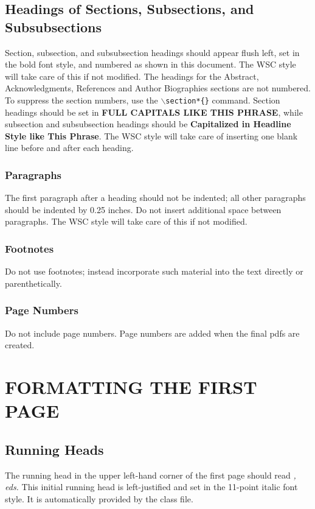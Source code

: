 \documentclass{wscpaperproc}
\theoremstyle{wsc}
\begin{document}
\subsection{Headings of Sections, Subsections, and Subsubsections}
Section, subsection, and subsubsection headings should appear flush left, set in the bold font style, and numbered as shown in this document. The WSC style will take care of this if not modified.
The headings for the Abstract, Acknowledgments, References and Author Biographies sections are not numbered.
To suppress the section numbers, use the {\tt $\backslash$section*\{\}} command.
Section headings should be set in {\bf FULL CAPITALS LIKE THIS PHRASE}, while subsection and subsubsection headings should be {\bf Capitalized
in Headline Style like This Phrase}. The WSC style will take care of inserting one blank line before and after each heading.

\subsubsection{Paragraphs}
The first paragraph after a heading should not be indented; all other paragraphs should be indented by 0.25 inches. Do not insert additional space between paragraphs. The WSC style will take care of this if not modified.

\subsubsection{Footnotes}
Do not use footnotes; instead incorporate such material into the text directly or parenthetically.

\subsubsection{Page Numbers}
Do not include page numbers. Page numbers are added when the final pdfs are created.

\section{FORMATTING THE FIRST PAGE}

\subsection{Running Heads}
The running head in the upper left-hand corner of the first page should read {\vspace{3pt}\newline \noindent \em \currentCaption \newline \currentEditors, eds. \newline}
\vskip 8pt\noindent This initial running head is left-justified and set in the 11-point italic font style.
It is automatically provided by the class file.
\end{document}
